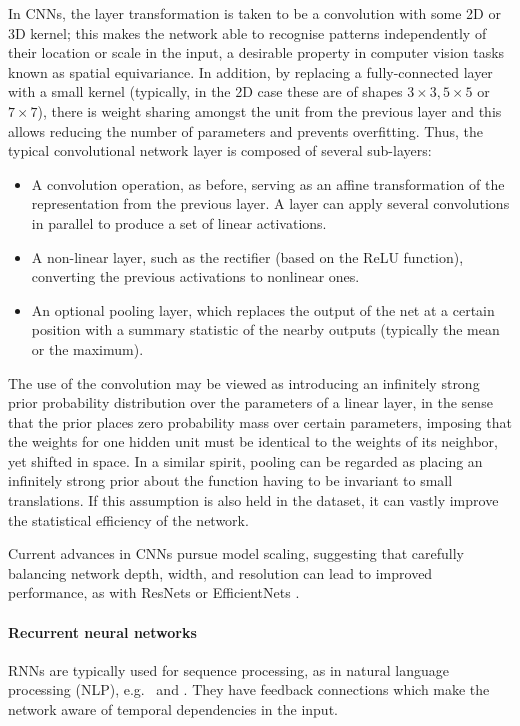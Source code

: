  In CNNs, the layer transformation is taken to be a convolution with some 2D or 3D kernel; this makes the network able to recognise patterns independently of their location or scale in the input, a desirable property in computer vision tasks known as spatial equivariance. In addition, by replacing a fully-connected layer with a small kernel (typically, in the 2D case these are of shapes $3\times3, 5\times 5$ or $7\times 7$), there is weight sharing amongst the unit from the previous layer and this allows reducing 
 the number of parameters and prevents overfitting.
 Thus, the typical convolutional network layer is composed of several sub-layers:
 \begin{itemize}
     \item A convolution operation, as before, 
     serving as an affine transformation of the representation from the previous layer. A layer can apply several convolutions in parallel to produce a set of linear activations.
     \item A non-linear layer, such as the rectifier (based on the ReLU function), converting the previous activations to nonlinear ones.
     \item An optional pooling layer, which replaces the output of the net at a certain position with a summary statistic of 
     the nearby outputs (typically the mean or the maximum).  
 \end{itemize}
 
 The use of the convolution may be viewed as introducing an inﬁnitely strong prior probability distribution over the parameters of a linear layer, in the sense that the prior places zero probability mass over certain parameters, imposing that the weights for one hidden unit must be identical to the weights of its neighbor, yet shifted in space. In a 
  similar spirit, pooling can be regarded as placing an inﬁnitely strong prior about the function having to be invariant to small translations. If this assumption is also held in the dataset, it can vastly improve the statistical eﬃciency of the network.
 
Current advances in CNNs pursue model scaling, suggesting that carefully balancing network depth, width, and resolution can lead to improved performance,
as with ResNets \parencite{he2016deep} or EfficientNets \parencite{tan2019efficientnet}.



\paragraph{Recurrent neural networks} RNNs are typically used for sequence processing, as in natural language processing (NLP), e.g.\ \parencite{hochreiter1997long} and \parencite{chung2014empirical}. They have feedback connections which make the network aware of temporal dependencies in the input.

